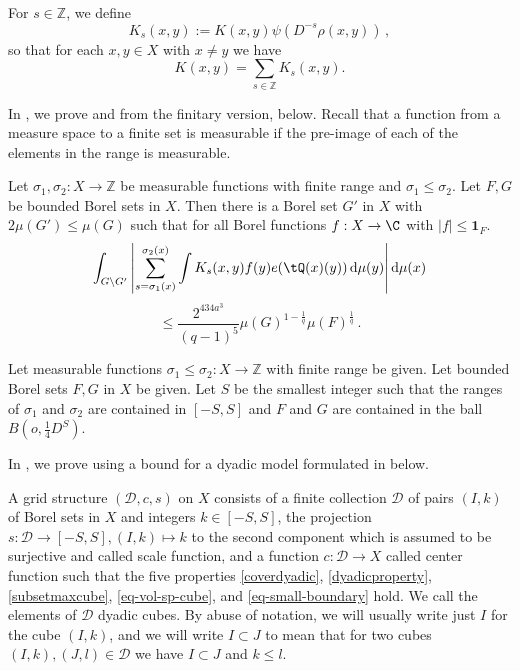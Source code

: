 For $s\in\mathbb{Z}$, we define
\begin{equation}\label{defks}
    K_s(x,y):=K(x,y)\psi(D^{-s}\rho(x,y))\,,
\end{equation}
so that for each $x, y \in X$ with $x\neq y$ we have
$$K(x,y)=\sum_{s\in\mathbb{Z}}K_s(x,y).$$

In , we prove  and 
from the finitary version,  below. Recall
that a function from a measure space to a finite set is measurable if the pre-image of each of the elements in the range is measurable.


\begin{proposition}
\label{finitary-Carleson}
\leanok
{}
Let ${\sigma_1},\sigma_2\colon X\to \mathbb{Z}$ be measurable functions with finite range and ${\sigma_1}\leq \sigma_2$.  Let $F,G$ be bounded Borel sets in $X$. Then there is a Borel set $G'$ in $X$ with $2\mu(G')\leq \mu(G)$ such that
for all Borel functions $f:X\to \C$ with $|f|\le \mathbf{1}_F$.
\begin{equation*}
    \int_{G \setminus G'} \left|\sum_{s={\sigma_1}(x)}^{{\sigma_2}(x)} \int K_s(x,y) f(y) e(\tQ(x)(y)) \, \mathrm{d}\mu(y) \right| \mathrm{d}\mu(x)
\end{equation*}
\begin{equation}
    \label{eq-linearized}
    \le \frac{2^{434a^3}}{(q-1)^5} \mu(G)^{1-\frac{1}{q}}
     \mu(F)^{\frac 1 q}\,.
\end{equation}
\end{proposition}
Let measurable functions ${\sigma_1}\leq \sigma_2\colon X\to \mathbb{Z}$ with finite range be given.
Let bounded Borel sets $F,G$ in $X$ be given.
Let $S$ be the smallest integer such that the ranges of
$\sigma_1$ and $\sigma_2$ are contained in $[-S,S]$ and $F$ and $G$ are contained
in the ball $B(o, \frac{1}{4}D^S)$.

In , we prove  using a
bound for a dyadic model formulated in  below.

A grid structure $(\mathcal{D}, c, s)$ on $X$ consists of a finite collection $\mathcal{D}$ of pairs $(I, k)$ of Borel
sets in $X$ and integers $k \in [-S, S]$, the projection $s\colon \mathcal{D}\to [-S, S], (I, k) \mapsto k$ to the second component which is assumed to be surjective and
called scale function, and a function $c:\mathcal{D}\to X$
called center function such that the five properties
\eqref{coverdyadic}, \eqref{dyadicproperty}, \eqref{subsetmaxcube},
\eqref{eq-vol-sp-cube}, and \eqref{eq-small-boundary} hold. We call the elements of $\mathcal{D}$ dyadic cubes. By abuse of notation, we will usually write just $I$ for the cube $(I,k)$, and we will write $I \subset J$ to mean that for two cubes $(I,k), (J, l) \in \mathcal{D}$ we have $I \subset J$ and $k \le l$.

